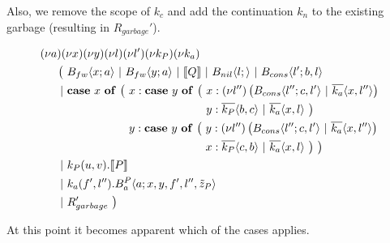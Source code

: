 Also, we remove the scope of $k_c$ and add the continuation $k_n$ to
the existing garbage (resulting in $R_{garbage}'$).

\begin{align*}
  &\anew{a}{\anew{x}{\anew{y}{\anew{l}{\anew{l'}{\anew{k_P}{\anew{k_a}{ \\
    &\hspace{0.5cm}
    \begin{aligned}[t]
      \big(\ &\ains{B_{fw}}{x}{a}
      \apar   \ains{B_{fw}}{y}{a}
      \apar   \encMJtoAP{Q}
      \apar   \ains{B_{nil}}{l}{}
      \apar   \ains{B_{cons}}{l'}{b, l}
      \\
      \apar
        &\begin{aligned}[t]
          \acse*{x}{\big(\ 
            &\aalt{x}{
              \begin{aligned}[t]
                \acse*{y}{\big(\ 
                  &\aalt{x}{\anew*{l''}{
                    \ains{B_{cons}}{l''}{c,l'} \apar \asnd{k_a}{x,l''}
                  }}\\
                  &\aalt{y}{
                    \asnd{k_P}{b,c} \apar \asnd{k_a}{x,l}
                  }\ 
                \big)}
              \end{aligned}
            }\\
            &\aalt{y}{
              \begin{aligned}[t]
                \acse*{y}{\big(\ 
                  &\aalt{y}{\anew*{l''}{
                    \ains{B_{cons}}{l''}{c,l'} \apar \asnd{k_a}{x,l''}
                  }}\\
                  &\aalt{x}{
                    \asnd{k_P}{c,b} \apar \asnd{k_a}{x,l}
                  }\ 
                \big)}
                \ \big)
              \end{aligned}
            }\ 
          }
        \end{aligned}
      \\
      \apar  &\arcv{k_P}{u,v} . \encMJtoAP{P}
      \\
      \apar  &\arcv{k_a}{f',l''} . \ains{B_a^P}{a}{x, y, f', l'',\tilde{z}_P}
      \\
      \apar  &R_{garbage}'
      \ \big)
    \end{aligned}
  }}}}}}}
\end{align*}

At this point it becomes apparent which of the cases applies.

